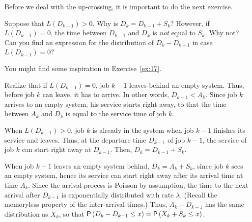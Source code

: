 Before we deal with the up-crossing, it is important to do the next exercise.
\begin{exercise}
  Suppose that $L(D_{k-1})>0$.
  Why is $D_k = D_{k-1} + S_{k}$?
  However, if $L(D_{k-1}) = 0$, the time between $D_{k-1}$ and $D_k$ is \emph{not} equal to $S_k$.
  Why not?
  Can you find an expression for the distribution of $D_k-D_{k-1}$ in case $L(D_{k-1})=0$?
\begin{hint}
    You might find some inspiration in Exercise~\ref{ex:17}.

    Realize that if $L(D_{k-1})=0$, job $k-1$ leaves behind an empty system.
    Thus, before job $k$ can leave, it has to arrive.
    In other words, $D_{k-1}<A_k$.
    Since job $k$ arrives to an empty system, his service starts right away, to that the time between $A_k$ and $D_k$ is equal to the service time of job $k$.
\end{hint}
\begin{solution}
  When $L(D_{k-1})>0$, job $k$ is already in the system when job $k-1$
  finishes its service and leaves. Thus, at the departure time
  $D_{k-1}$ of job $k-1$, the service of job $k$ can start right away
  at $D_{k-1}$. Then, $D_k=D_{k-1}+S_k$.


    When job $k-1$ leaves an empty system behind, $D_k= A_k + S_k$,
    since job $k$ sees an empty system, hence its service can start
    right away after its arrival time at time $A_k$. Since the arrival
    process is Poisson by assumption, the time to the next arrival
    after $D_{k-1}$ is exponentially distributed with rate
    $\lambda$. (Recall the memoryless property of the inter-arrival
    times.) Thus, $A_k - D_{k-1}$ has the same distribution as $X_k$,
    so that $\P{D_k - D_{k-1} \leq x} = \P{X_k + S_k\leq x}$. 
\end{solution}
\end{exercise}

